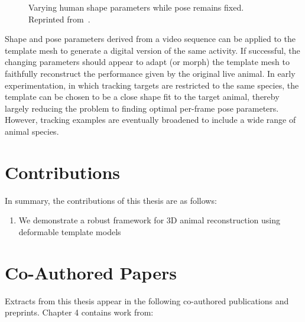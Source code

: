     \begin{figure}[H] %
        \caption{Varying human shape parameters while pose remains fixed. Reprinted from~\cite{Streuber:SIGGRAPH:2016}.}
        \label{fig:black_shape}
    \end{figure}
    
    Shape and pose parameters derived from a video sequence can be applied to the template mesh to generate a digital version of the same activity. If successful, the changing parameters should appear to adapt (or morph) the template mesh to faithfully reconstruct the performance given by the original live animal. In early experimentation, in which tracking targets are restricted to the same species, the template can be chosen to be a close shape fit to the target animal, thereby largely reducing the problem to finding optimal per-frame pose parameters. However, tracking examples are eventually broadened to include a wide range of animal species.

\section{Contributions}  %
In summary, the contributions of this thesis are as follows:
\begin{enumerate}
    \item We demonstrate a robust framework for 3D animal reconstruction using deformable template models
\end{enumerate}

\section{Co-Authored Papers}  %

Extracts from this thesis appear in the following co-authored publications and preprints. Chapter 4 contains work from:

